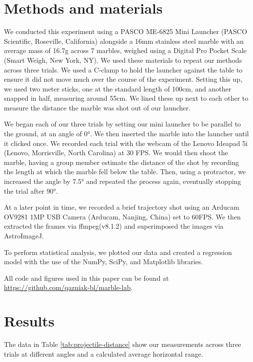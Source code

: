 \documentclass[amsmath,amssymb,aps,endfloats,linenumbers]{revtex4-2}
\begin{document}
\section{Methods and materials}
We conducted this experiment using a PASCO ME-6825 Mini Launcher (PASCO Scientific, Roseville, California) alongside a 16mm stainless steel marble with an average mass of 16.7g across 7 marbles, weighed using a Digital Pro Pocket Scale (Smart Weigh, New York, NY). We used these materials to repeat our methods across three trials. We used a C-clamp to hold the launcher against the table to ensure it did not move much over the course of the experiment.
Setting this up, we used two meter sticks, one at the standard length of 100cm, and another snapped in half, measuring around 55cm. We lined these up next to each other to measure the distance the marble was shot out of our launcher.

We began each of our three trials by setting our mini launcher to be parallel to the ground, at an angle of 0°. We then inserted the marble into the launcher until it clicked once. We recorded each trial with the webcam of the Lenovo Ideapad 5i (Lenovo, Morrisville, North Carolina) at 30 FPS.
We would then shoot the marble, having a group member estimate the distance of the shot by recording the length at which the marble fell below the table. Then, using a protractor, we increased the angle by 7.5° and repeated the process again, eventually stopping the trial after 90°.

At a later point in time, we recorded a brief trajectory shot using an Arducam OV9281 1MP USB Camera (Arducam, Nanjing, China) set to 60FPS. We then extracted the frames via ffmpeg(v8.1.2) and superimposed the images via AstroImageJ\cite{Collins:2017:AstroImageJ}.

To perform statistical analysis, we plotted our data and created a regression model with the use of the NumPy, SciPy, and Matplotlib libraries\cite{numpy,scipy,matplotlib}.


All code and figures used in this paper can be found at \url{https://github.com/qazniak-bl/marble-lab}.

\section{Results}

The data in Table \cref{tab:projectile-distance} show our measurements across three trials at different angles and a calculated average horizontal range.
\end{document}
